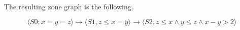 \begin{example}

The resulting zone graph is the following.

	\[\langle S0; x=y=z  \rangle \rightarrow \langle S1, z \leq x=y \rangle \rightarrow \langle S2, z \leq x \wedge y \leq z \wedge x-y>2 \rangle \]

\end{example}

